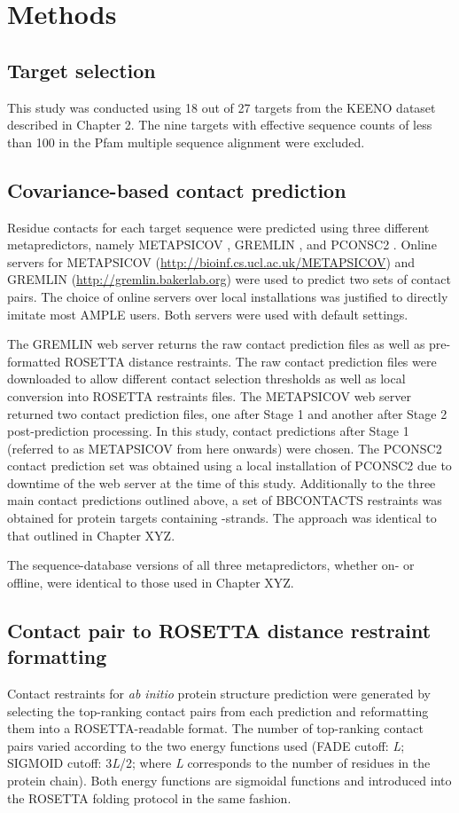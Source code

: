 \section{Methods}

\subsection{Target selection}
This study was conducted using 18 out of 27 targets from the KEENO dataset described in Chapter 2. The nine targets with effective sequence counts of less than 100 in the Pfam multiple sequence alignment were excluded.

\subsection{Covariance-based contact prediction}
Residue contacts for each target sequence were predicted using three different metapredictors, namely METAPSICOV \cite{Jones2015-wp}, GREMLIN \cite{Kamisetty2013-bs}, and PCONSC2 \cite{Skwark2014-mu}. Online servers for METAPSICOV (\url{http://bioinf.cs.ucl.ac.uk/METAPSICOV}) and GREMLIN (\url{http://gremlin.bakerlab.org}) were used to predict two sets of contact pairs. The choice of online servers over local installations was justified to directly imitate most AMPLE users. Both servers were used with default settings.

The GREMLIN web server returns the raw contact prediction files as well as pre-formatted ROSETTA distance restraints. The raw contact prediction files were downloaded to allow different contact selection thresholds as well as local conversion into ROSETTA restraints files. The METAPSICOV web server returned two contact prediction files, one after Stage 1 and another after Stage 2 post-prediction processing. In this study, contact predictions after Stage 1 (referred to as METAPSICOV from here onwards) were chosen. The PCONSC2 contact prediction set was obtained using a local installation of PCONSC2 due to downtime of the web server at the time of this study. Additionally to the three main contact predictions outlined above, a set of BBCONTACTS restraints was obtained for protein targets containing \textbeta-strands. The approach was identical to that outlined in Chapter XYZ.

The sequence-database versions of all three metapredictors, whether on- or offline, were identical to those used in Chapter XYZ.

\subsection{Contact pair to ROSETTA distance restraint formatting}
Contact restraints for \textit{ab initio} protein structure prediction were generated by selecting the top­-ranking contact pairs from each prediction and reformatting them into a ROSETTA-readable format. The number of top-­ranking contact pairs varied according to the two energy functions used (FADE cutoff: \textit{L}; SIGMOID cutoff: 3\textit{L}/2; where \textit{L} corresponds to the number of residues in the protein chain). Both energy functions are sigmoidal functions and introduced into the ROSETTA folding protocol in the same fashion. 

